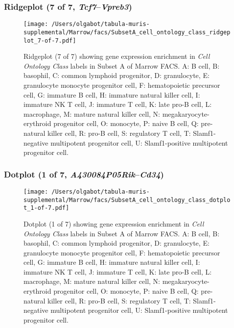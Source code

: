 \subsubsection{Ridgeplot (7 of 7, \emph{Tcf7}--\emph{Vpreb3})}
\begin{figure}[h]
\centering
\texttt{[image: /Users/olgabot/tabula-muris-supplemental/Marrow/facs/SubsetA\_cell\_ontology\_class\_ridgeplot\_7-of-7.pdf]}

\caption{ Ridgeplot (7 of 7)  showing gene expression enrichment in \emph{Cell Ontology Class} labels in Subset A of Marrow FACS. A: B cell, B: basophil, C: common lymphoid progenitor, D: granulocyte, E: granulocyte monocyte progenitor cell, F: hematopoietic precursor cell, G: immature B cell, H: immature natural killer cell, I: immature NK T cell, J: immature T cell, K: late pro-B cell, L: macrophage, M: mature natural killer cell, N: megakaryocyte-erythroid progenitor cell, O: monocyte, P: naive B cell, Q: pre-natural killer cell, R: pro-B cell, S: regulatory T cell, T: Slamf1-negative multipotent progenitor cell, U: Slamf1-positive multipotent progenitor cell.}
\end{figure}


\clearpage

\subsubsection{Dotplot (1 of 7, \emph{A430084P05Rik}--\emph{Cd34})}
\begin{figure}[h]
\centering
\texttt{[image: /Users/olgabot/tabula-muris-supplemental/Marrow/facs/SubsetA\_cell\_ontology\_class\_dotplot\_1-of-7.pdf]}

\caption{ Dotplot (1 of 7)  showing gene expression enrichment in \emph{Cell Ontology Class} labels in Subset A of Marrow FACS. A: B cell, B: basophil, C: common lymphoid progenitor, D: granulocyte, E: granulocyte monocyte progenitor cell, F: hematopoietic precursor cell, G: immature B cell, H: immature natural killer cell, I: immature NK T cell, J: immature T cell, K: late pro-B cell, L: macrophage, M: mature natural killer cell, N: megakaryocyte-erythroid progenitor cell, O: monocyte, P: naive B cell, Q: pre-natural killer cell, R: pro-B cell, S: regulatory T cell, T: Slamf1-negative multipotent progenitor cell, U: Slamf1-positive multipotent progenitor cell.}
\end{figure}


\clearpage

